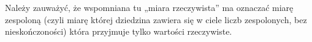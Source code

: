 \documentclass[a4paper,11pt]{article}
\begin{document}
\vspace{\spaceTwo}














\start {} Należy zauważyć, że wspomniana tu „miara
rzeczywista” ma oznaczać miarę zespoloną (czyli miarę której
dziedzina zawiera się w ciele liczb zespolonych, bez nieskończoności)
która przyjmuje tylko wartości rzeczywiste.



\end{document}
